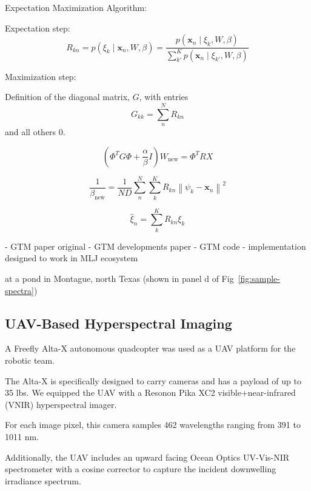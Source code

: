 \documentclass[remotesensing,article,submit,pdftex,moreauthors]{Definitions/mdpi}
\begin{document}
Expectation Maximization Algorithm:

Expectation step:
\begin{equation}\label{eq:responsibility}
    R_{kn} = p(\xi_k \mid \mathbf{x}_n, W, \beta) = \dfrac{p(\mathbf{x}_n \mid \xi_k, W, \beta)}{\sum\limits_{k'}^{K} p(\mathbf{x}_n \mid \xi_{k'}, W, \beta)}
\end{equation}

Maximization step:

Definition of the diagonal matrix, $G$, with entries
\begin{equation}
    G_{kk}  = \sum\limits_n^N R_{kn}
\end{equation}
and all others $0$.

\begin{equation}\label{eq:W-update}
    \left(\Phi^T G \Phi + \dfrac{\alpha}{\beta}I \right)W_{\text{new}} = \Phi^T R X 
\end{equation}

\begin{equation}
    \frac{1}{\beta_{\text{new}}} = \frac{1}{ND} \sum\limits_{n}^{N} \sum\limits_{k}^{K} R_{kn} \left\lVert \psi_k - \mathbf{x}_n \right\rVert^2
\end{equation}


\begin{equation}
    \hat{\xi}_n = \sum_{k}^K R_{kn}\xi_k
\end{equation}

- GTM paper original \cite{gtm-bishop-1}
- GTM developments paper \cite{gtm-bishop-2}
- GTM code \cite{gtm-code}
- implementation designed to work in MLJ ecosystem \cite{blaom2020mlj}


at a pond in Montague, north Texas (shown in panel d of Fig~\ref{fig:sample-spectra})




\subsection{UAV-Based Hyperspectral Imaging}
A Freefly Alta-X autonomous quadcopter was used as a UAV platform for the robotic team.

The Alta-X is specifically designed to carry cameras and has a payload of up to 35 lbs. We equipped the UAV with a Resonon Pika XC2 visible+near-infrared (VNIR) hyperspectral imager. 

For each image pixel, this camera samples 462 wavelengths ranging from 391 to 1011 nm. 

Additionally, the UAV includes an upward facing Ocean Optics UV-Vis-NIR spectrometer with a cosine corrector to capture the incident downwelling irradiance spectrum.
\end{document}
